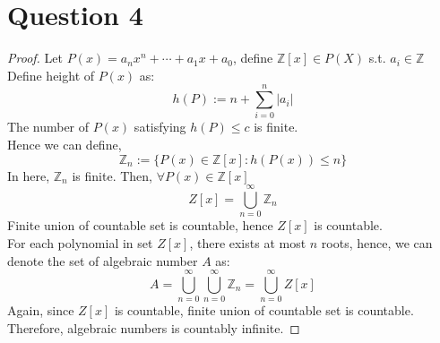 \documentclass{article}
\begin{document}
\section*{Question 4}
\begin{proof}
    Let $P(x) = a_nx^n + \cdots + a_1x + a_0$, define $\mathbb{Z}[x] \in P(X)$ s.t. $a_i \in \mathbb{Z}$
    \\
    Define height of $P(x)$ as:
    \[ h(P) := n + \sum_{i = 0}^{n} |a_i| \]
    The number of $P(x)$ satisfying $h(P) \leq c$ is finite.
    \\
    Hence we can define,
    \[ \mathbb{Z}_n := \{ P(x) \in \mathbb{Z}[x]: h(P(x)) \leq n \} \]
    In here, $\mathbb{Z}_n$ is finite. Then, $\forall P(x) \in \mathbb{Z}[x]$
    \[ Z[x] = \bigcup_{n=0}^{\infty} \mathbb{Z}_n \]
    Finite union of countable set is countable, hence $Z[x]$ is countable.
    \\
    For each polynomial in set $Z[x]$, there exists at most $n$ roots, hence, we can denote the set of algebraic number $A$ as:
    \[ A = \bigcup_{n=0}^{\infty} \bigcup_{n=0}^{\infty} \mathbb{Z}_n =  \bigcup_{n=0}^{\infty} Z[x] \]
    Again, since $Z[x]$ is countable, finite union of countable set is countable.
    \\
    Therefore, algebraic numbers is countably infinite.
\end{proof}
\end{document}
